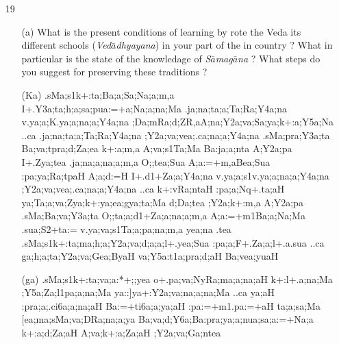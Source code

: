 {\begin{itemize}
  \item[19] \begin{itemize}
            
            \item[(a)] What is the present conditions of learning by rote the Veda its different schools ({\textit {Ved$\bar{a}$dhyayana}}) in your part of the in country ? What in particular is the state of the knowledage of {\textit {S$\bar{a}$mag$\bar{a}$na}} ? What steps do you suggest for preserving these traditions ?
\end{itemize}
\end{itemize}
}

\begin{itemize} 
\item[]		 \begin{itemize}               
                \item[({\sktf Ka})] {\sktf .sMa;s1k+:ta;Ba;a;Sa;Na;a;m,a I+.Y3a;ta;h;a;sa;pua:=+a;Na;a;na;Ma
.ja;na;ta;a;Ta;Ra;Y4a;na v.ya;a;K.ya;a;na;a;Y4a;na\ZF{,} ;Da;mRa;d;ZR,aA;na;Y2a;va;Sa;ya;k+:a;Y5a;Na ..ca .ja;na;ta;a;Ta;Ra;Y4a;na
;Y2a;va;vea;.ca;na;a;Y4a;na .sMa;pra;Y3a;ta Ba;va;tpra;d;Za;ea
k+:a;m,a A;va;s1Ta;Ma Ba:ja;a;nta A;Y2a;pa I+.Zya;tea
.ja;na;a;na;a;m,a O;;tea;Sua A;a:=+m,aBea;Sua :pa;ya;Ra;tpaH A;a;d:=H
I+.d1+Za;a;Y4a;na v.ya;a;s1v.ya;a;na;a;Y4a;na
;Y2a;va;vea;.ca;na;a;Y4a;na ..ca k+:vRa;ntaH
:pa;a;Nq+.ta;aH ya;Ta;a;va;Zya;k+:ya;ea;gya;ta;Ma
d;Da;tea ;Y2a;k+:m,a A;Y2a;pa .sMa;Ba;va;Y3a;ta O;;ta;a;d1+Za;a;na;a;m,a A;a:=+m1Ba;a;Na;Ma
.sua;S2+ta:= v.ya;va;s1Ta;a;pa;na;m,a\ZF{,} yea;na .tea
.sMa;s1k+:ta;ma;h;a;Y2a;va;d;a;a;l+.yea;Sua
:pa;a;F+.Za;a;l+.a.sua ..ca ga;h;a;ta;Y2a;va;Gea;ByaH
va;Y5a:t1a;pra;d;aH Ba;vea;yuaH}
                
                \item[({\sktf ga})] {\sktf .sMa;s1k+:ta;va;a:*+;;yea
o+.pa;va;NyRa;ma;a;na;aH k+:l+.a;na;Ma\ZF{,} ;Y5a;Za;l1pa;a;na;Ma\ZF{,}
ya::]ya\ZF{-}+:Y2a;va;na;a;na;Ma ..ca ya;aH :pra;a;.ci6a;a;na;aH Ba:=+ti6a;a;ya;aH
:pa:=+m1.pa:=+aH\ZF{,} ta;a;sa;Ma [ea;ma;sMa;va;DRa;na;a;ya
Ba;va;d;Y6a;Ba\ZF{-}:pra;ya;a;nua;sa;a:=+Na;a
k+:a;d;Za;aH A;va;k+:a;Za;aH ;Y2a;va;Ga;ntea} 
                

\end{itemize}
\end{itemize}
